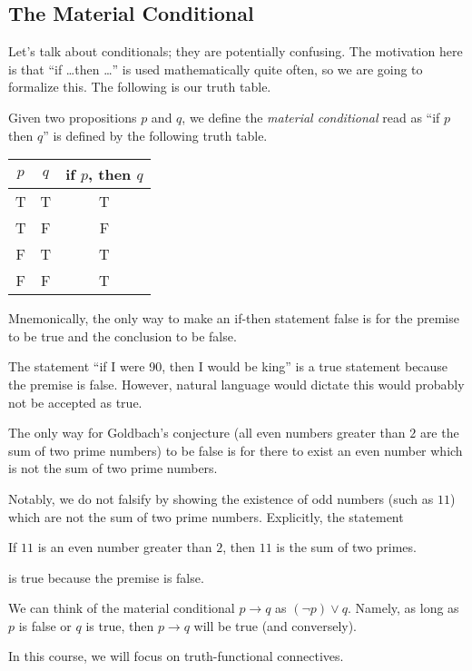 \subsection{The Material Conditional}
Let's talk about conditionals; they are potentially confusing. The motivation here is that ``if \ldots then \ldots'' is used mathematically quite often, so we are going to formalize this. The following is our truth table.
\begin{definition}
	Given two propositions $p$ and $q$, we define the \textit{material conditional} read as ``if $p$ then $q$'' is defined by the following truth table.
	\begin{center}
		\begin{tabular}{cc|c}
			$p$ & $q$ & if $p$, then $q$ \\\hline
			T & T & T \\
			T & F & F \\
			F & T & T \\
			F & F & T
		\end{tabular}
	\end{center}
\end{definition}
Mnemonically, the only way to make an if-then statement false is for the premise to be true and the conclusion to be false.
\begin{warn}
	The statement ``if I were 90, then I would be king'' is a true statement because the premise is false. However, natural language would dictate this would probably not be accepted as true.
\end{warn}
\begin{example}
	The only way for Goldbach's conjecture (all even numbers greater than $2$ are the sum of two prime numbers) to be false is for there to exist an even number which is not the sum of two prime numbers.
	
	Notably, we do not falsify by showing the existence of odd numbers (such as $11$) which are not the sum of two prime numbers. Explicitly, the statement
	\begin{center}
		If $11$ is an even number greater than $2$, then $11$ is the sum of two primes.
	\end{center}
	is true because the premise is false.
\end{example}
\begin{remark}
	We can think of the material conditional $p\to q$ as $(\lnot p)\lor q$. Namely, as long as $p$ is false or $q$ is true, then $p\to q$ will be true (and conversely).
\end{remark}
In this course, we will focus on truth-functional connectives.


